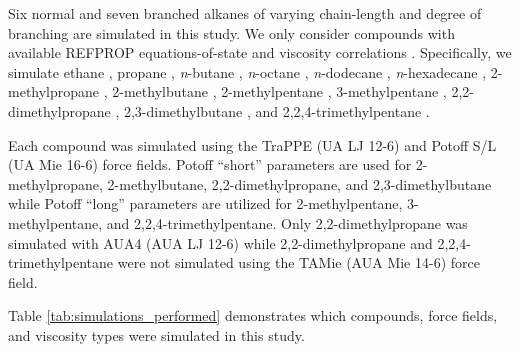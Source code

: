\documentclass[preprint,review,12pt]{elsarticle}
\begin{document}
	Six normal and seven branched alkanes of varying chain-length and degree of branching are simulated in this study. We only consider compounds with available REFPROP equations-of-state and viscosity correlations \cite{LEMMON-RP91}. Specifically, we simulate ethane \cite{Ethane2006,Vogel2015}, propane \cite{Propane2009,Vogel2016}, \textit{n}-butane \cite{Butane2006,Hermann2018}, \textit{n}-octane \cite{Beckmueller2017,Huber2004FPE}, \textit{n}-dodecane \cite{Lemmon2004,Huber2004}, \textit{n}-hexadecane \cite{Romeo2018,Vesovic2017}, 2-methylpropane \cite{Lemmon2006,Vogel2000}, 2-methylbutane \cite{Lemmon2006,Huber2018}, 2-methylpentane \cite{Lemmon2006,Huber2018}, 3-methylpentane \cite{Gao2017,Huber2018}, 2,2-dimethylpropane \cite{Lemmon2006,Huber2018}, 2,3-dimethylbutane \cite{Gao2017,Huber2018}, and 2,2,4-trimethylpentane \cite{Blackham2017,Huber2018}. 
	
	Each compound was simulated using the TraPPE (UA LJ 12-6) and Potoff S/L (UA Mie 16-6) force fields. Potoff ``short'' parameters are used for 2-methylpropane, 2-methylbutane, 2,2-dimethylpropane, and 2,3-dimethylbutane while Potoff ``long'' parameters are utilized for 2-methylpentane, 3-methylpentane, and 2,2,4-trimethylpentane. Only 2,2-dimethylpropane was simulated with AUA4 (AUA LJ 12-6) while 2,2-dimethylpropane and 2,2,4-trimethylpentane were not simulated using the TAMie (AUA Mie 14-6) force field.
	
	Table \ref{tab:simulations_performed} demonstrates which compounds, force fields, and viscosity types were simulated in this study.
	
\end{document}
